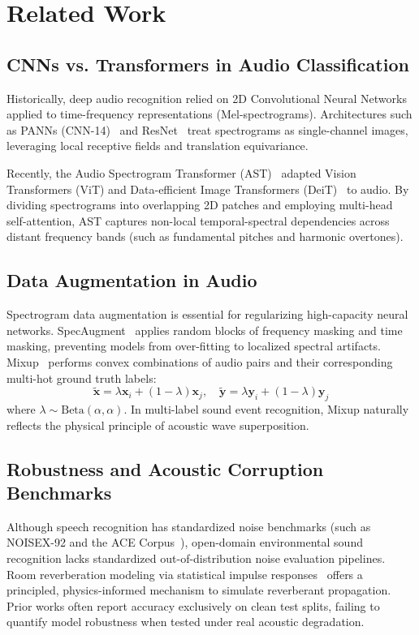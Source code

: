 \documentclass[11pt,a4paper]{article}
\begin{document}
\section{Related Work}

\subsection{CNNs vs. Transformers in Audio Classification}
Historically, deep audio recognition relied on 2D Convolutional Neural Networks applied to time-frequency representations (Mel-spectrograms). Architectures such as PANNs (CNN-14)~\cite{kong2020panns} and ResNet~\cite{he2016deep} treat spectrograms as single-channel images, leveraging local receptive fields and translation equivariance.

Recently, the Audio Spectrogram Transformer (AST)~\cite{gong2021ast} adapted Vision Transformers (ViT) and Data-efficient Image Transformers (DeiT)~\cite{touvron2021training} to audio. By dividing spectrograms into overlapping 2D patches and employing multi-head self-attention, AST captures non-local temporal-spectral dependencies across distant frequency bands (such as fundamental pitches and harmonic overtones).

\subsection{Data Augmentation in Audio}
Spectrogram data augmentation is essential for regularizing high-capacity neural networks. SpecAugment~\cite{park2019specaugment} applies random blocks of frequency masking and time masking, preventing models from over-fitting to localized spectral artifacts. Mixup~\cite{zhang2018mixup} performs convex combinations of audio pairs and their corresponding multi-hot ground truth labels:
\begin{equation}
    \tilde{\mathbf{x}} = \lambda \mathbf{x}_i + (1 - \lambda) \mathbf{x}_j, \quad \tilde{\mathbf{y}} = \lambda \mathbf{y}_i + (1 - \lambda) \mathbf{y}_j
\end{equation}
where $\lambda \sim \text{Beta}(\alpha, \alpha)$. In multi-label sound event recognition, Mixup naturally reflects the physical principle of acoustic wave superposition.

\subsection{Robustness and Acoustic Corruption Benchmarks}
Although speech recognition has standardized noise benchmarks (such as NOISEX-92 and the ACE Corpus~\cite{eaton2016ace}), open-domain environmental sound recognition lacks standardized out-of-distribution noise evaluation pipelines. Room reverberation modeling via statistical impulse responses~\cite{schroeder1962natural} offers a principled, physics-informed mechanism to simulate reverberant propagation. Prior works often report accuracy exclusively on clean test splits, failing to quantify model robustness when tested under real acoustic degradation.
\end{document}
